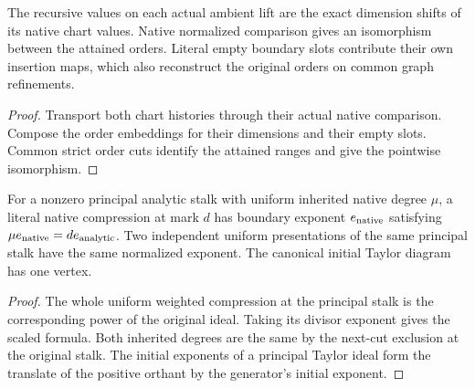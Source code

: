 \begin{theorem}
\label{hir:g1-native-chart-attained-value-order}
\leanok
The recursive values on each actual ambient lift are the exact
dimension shifts of its native chart values. Native normalized
comparison gives an isomorphism between the attained orders.
Literal empty boundary slots contribute their own insertion maps,
which also reconstruct the original orders on common graph refinements.
\end{theorem}
\begin{proof}
Transport both chart histories through their actual native
comparison. Compose the order embeddings for their dimensions
and their empty slots. Common strict order cuts identify the
attained ranges and give the pointwise isomorphism.
\end{proof}

\begin{theorem}
\label{hir:g1-native-principal-boundary-ratio}
\leanok
For a nonzero principal analytic stalk with uniform inherited
native degree $\mu$, a literal native compression at mark $d$
has boundary exponent $e_{\rm native}$ satisfying
$\mu e_{\rm native}=d e_{\rm analytic}$. Two independent uniform
presentations of the same principal stalk have the same normalized
exponent. The canonical initial Taylor diagram has one vertex.
\end{theorem}
\begin{proof}
The whole uniform weighted compression at the principal stalk
is the corresponding power of the original ideal. Taking its
divisor exponent gives the scaled formula. Both inherited degrees
are the same by the next-cut exclusion at the original stalk.
The initial exponents of a principal Taylor ideal form the
translate of the positive orthant by the generator's initial exponent.
\end{proof}


